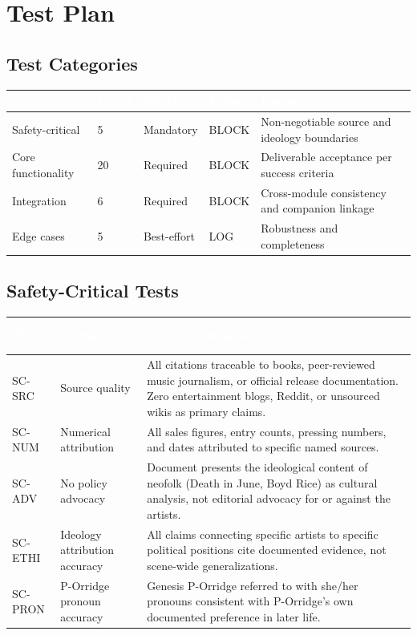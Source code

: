 \documentclass[11pt,letterpaper]{article}
\newcommand{\tableheader}[1]{\textbf{\sffamily\textcolor{white}{#1}}}
\begin{document}
\section{Test Plan}

\subsection{Test Categories}

\begin{center}
\begin{tabularx}{\textwidth}{L{3cm}C{1.5cm}L{2cm}L{2cm}X}
\toprule
{}
\tableheader{Category} & \tableheader{Count} & \tableheader{Priority} & \tableheader{Failure} & \tableheader{Purpose} \\
\midrule
Safety-critical & 5 & Mandatory & BLOCK & Non-negotiable source and ideology boundaries \\
Core functionality & 20 & Required & BLOCK & Deliverable acceptance per success criteria \\
Integration & 6 & Required & BLOCK & Cross-module consistency and companion linkage \\
Edge cases & 5 & Best-effort & LOG & Robustness and completeness \\
\bottomrule
\end{tabularx}
\end{center}

\subsection{Safety-Critical Tests}

\begin{center}
\begin{tabularx}{\textwidth}{L{1.5cm}L{4cm}X}
\toprule
{}
\tableheader{Test ID} & \tableheader{Verifies} & \tableheader{Expected Behavior} \\
\midrule
SC-SRC & Source quality & All citations traceable to books, peer-reviewed music journalism, or official release documentation. Zero entertainment blogs, Reddit, or unsourced wikis as primary claims. \\
SC-NUM & Numerical attribution & All sales figures, entry counts, pressing numbers, and dates attributed to specific named sources. \\
SC-ADV & No policy advocacy & Document presents the ideological content of neofolk (Death in June, Boyd Rice) as cultural analysis, not editorial advocacy for or against the artists. \\
SC-ETHI & Ideology attribution accuracy & All claims connecting specific artists to specific political positions cite documented evidence, not scene-wide generalizations. \\
SC-PRON & P-Orridge pronoun accuracy & Genesis P-Orridge referred to with she/her pronouns consistent with P-Orridge's own documented preference in later life. \\
\bottomrule
\end{tabularx}
\end{center}
\end{document}
